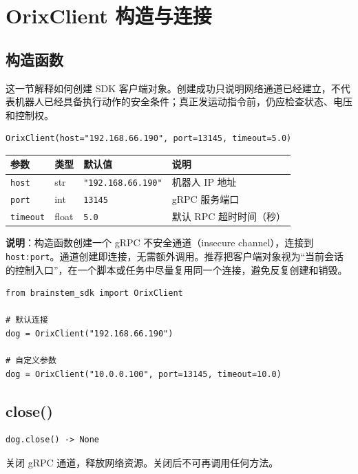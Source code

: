 \documentclass[a4paper,11pt,openany]{book}
\begin{document}
\section{OrixClient 构造与连接}

\subsection{构造函数}

这一节解释如何创建 SDK 客户端对象。创建成功只说明网络通道已经建立，不代表机器人已经具备执行动作的安全条件；真正发运动指令前，仍应检查状态、电压和控制权。

\begin{lstlisting}[style=python]
OrixClient(host="192.168.66.190", port=13145, timeout=5.0)
\end{lstlisting}

\begin{longtable}{llll}
\toprule
参数 & 类型 & 默认值 & 说明 \\
\midrule
\endhead
\texttt{host} & str & \texttt{"192.168.66.190"} & 机器人 IP 地址 \\
\texttt{port} & int & \texttt{13145} & gRPC 服务端口 \\
\texttt{timeout} & float & \texttt{5.0} & 默认 RPC 超时时间（秒） \\
\bottomrule
\end{longtable}

\noindent\textbf{说明}：构造函数创建一个 gRPC 不安全通道（insecure channel），连接到 \texttt{host:port}。通道创建即连接，无需额外调用。推荐把客户端对象视为“当前会话的控制入口”，在一个脚本或任务中尽量复用同一个连接，避免反复创建和销毁。

\begin{lstlisting}[style=python]
from brainstem_sdk import OrixClient

# 默认连接
dog = OrixClient("192.168.66.190")

# 自定义参数
dog = OrixClient("10.0.0.100", port=13145, timeout=10.0)
\end{lstlisting}

\subsection{close()}

\begin{lstlisting}[style=python,numbers=none]
dog.close() -> None
\end{lstlisting}

关闭 gRPC 通道，释放网络资源。关闭后不可再调用任何方法。
\end{document}
